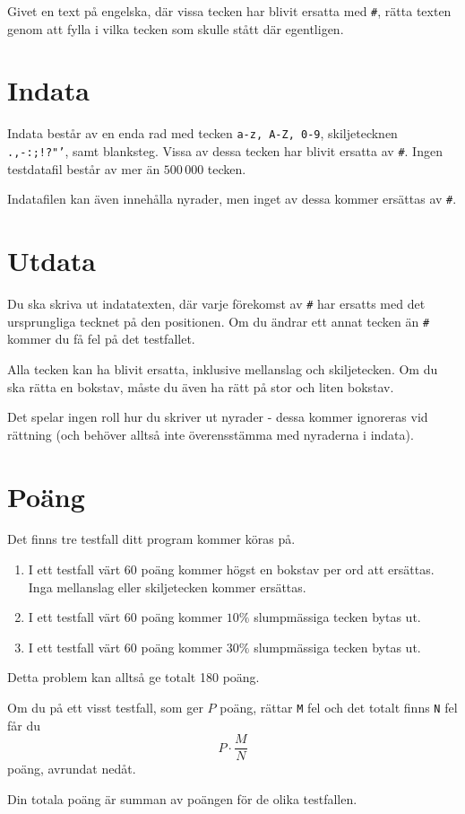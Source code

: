 
Givet en text på engelska, där vissa tecken har blivit ersatta med \texttt{\#}, rätta texten genom att fylla i vilka tecken som skulle stått där egentligen.

\section*{Indata}
Indata består av en enda rad med tecken \texttt{a-z, A-Z, 0-9}, skiljetecknen \texttt{.,-:;!?"'}, samt blanksteg. Vissa av dessa tecken har blivit ersatta av \texttt{\#}.
Ingen testdatafil består av mer än $500\,000$ tecken.

Indatafilen kan även innehålla nyrader, men inget av dessa kommer ersättas av \texttt{\#}.

\section*{Utdata}
Du ska skriva ut indatatexten, där varje förekomst av \texttt{\#} har ersatts med det ursprungliga tecknet på den positionen. Om du ändrar ett annat
tecken än \texttt{\#} kommer du få fel på det testfallet.

Alla tecken kan ha blivit ersatta, inklusive mellanslag och skiljetecken. Om du ska rätta en bokstav, måste du även ha rätt på stor och liten bokstav.

Det spelar ingen roll hur du skriver ut nyrader - dessa kommer ignoreras vid rättning (och behöver alltså inte överensstämma med nyraderna i indata).

\section*{Poäng}

Det finns tre testfall ditt program kommer köras på.
\begin{enumerate}
  \item I ett testfall värt 60 poäng kommer högst en bokstav per ord att ersättas. Inga mellanslag eller skiljetecken kommer ersättas.
  \item I ett testfall värt 60 poäng kommer $10\%$ slumpmässiga tecken bytas ut.
  \item I ett testfall värt 60 poäng kommer $30\%$ slumpmässiga tecken bytas ut.
\end{enumerate}

Detta problem kan alltså ge totalt 180 poäng.

Om du på ett visst testfall, som ger $P$ poäng, rättar \texttt{M} fel och det totalt finns \texttt{N} fel får du 
$$P \cdot \frac{M}{N}$$
poäng, avrundat nedåt.

Din totala poäng är summan av poängen för de olika testfallen.
